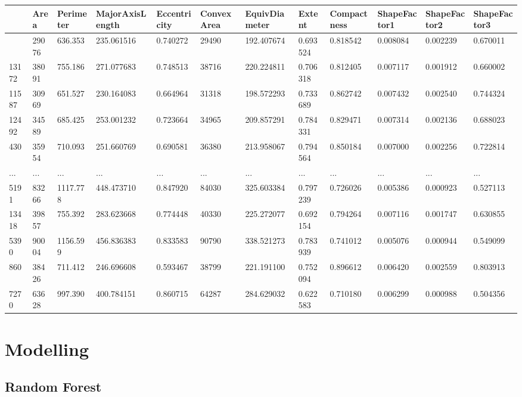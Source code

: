 \documentclass[
  letterpaper,
]{krantz}
\begin{document}
\begin{longtable}[]{@{}llllllllllll@{}}
\toprule\noalign{}
& Area & Perimeter & MajorAxisLength & Eccentricity & ConvexArea &
EquivDiameter & Extent & Compactness & ShapeFactor1 & ShapeFactor2 &
ShapeFactor3 \\
\midrule\noalign{}
\endhead
\bottomrule\noalign{}
\endlastfoot
11073 & 29076 & 636.353 & 235.061516 & 0.740272 & 29490 & 192.407674 &
0.693524 & 0.818542 & 0.008084 & 0.002239 & 0.670011 \\
13172 & 38091 & 755.186 & 271.077683 & 0.748513 & 38716 & 220.224811 &
0.706318 & 0.812405 & 0.007117 & 0.001912 & 0.660002 \\
11587 & 30969 & 651.527 & 230.164083 & 0.664964 & 31318 & 198.572293 &
0.733689 & 0.862742 & 0.007432 & 0.002540 & 0.744324 \\
12492 & 34589 & 685.425 & 253.001232 & 0.723664 & 34965 & 209.857291 &
0.784331 & 0.829471 & 0.007314 & 0.002136 & 0.688023 \\
430 & 35954 & 710.093 & 251.660769 & 0.690581 & 36380 & 213.958067 &
0.794564 & 0.850184 & 0.007000 & 0.002256 & 0.722814 \\
... & ... & ... & ... & ... & ... & ... & ... & ... & ... & ... & ... \\
5191 & 83266 & 1117.778 & 448.473710 & 0.847920 & 84030 & 325.603384 &
0.797239 & 0.726026 & 0.005386 & 0.000923 & 0.527113 \\
13418 & 39857 & 755.392 & 283.623668 & 0.774448 & 40330 & 225.272077 &
0.692154 & 0.794264 & 0.007116 & 0.001747 & 0.630855 \\
5390 & 90004 & 1156.599 & 456.836383 & 0.833583 & 90790 & 338.521273 &
0.783939 & 0.741012 & 0.005076 & 0.000944 & 0.549099 \\
860 & 38426 & 711.412 & 246.696608 & 0.593467 & 38799 & 221.191100 &
0.752094 & 0.896612 & 0.006420 & 0.002559 & 0.803913 \\
7270 & 63628 & 997.390 & 400.784151 & 0.860715 & 64287 & 284.629032 &
0.622583 & 0.710180 & 0.006299 & 0.000988 & 0.504356 \\
\end{longtable}

\hypertarget{modelling}{%
\section{Modelling}\label{modelling}}

\hypertarget{random-forest}{%
\subsection{Random Forest}\label{random-forest}}
\end{document}
